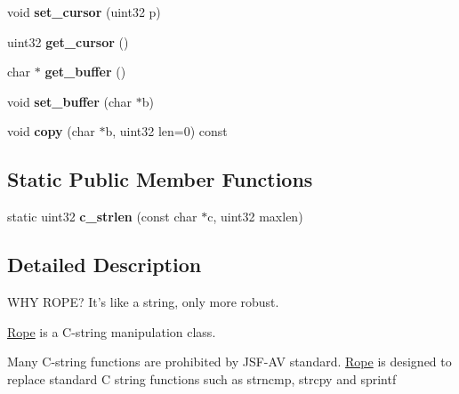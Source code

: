 \begin{DoxyCompactItemize}
\item 
\hypertarget{classetk_1_1_rope_a882650da4df7e20bd95f01c9e08ae0a5}{void {\bfseries set\-\_\-cursor} (uint32 p)}\label{classetk_1_1_rope_a882650da4df7e20bd95f01c9e08ae0a5}

\item 
\hypertarget{classetk_1_1_rope_a4683a4ade92618f04252ee503b58ca00}{uint32 {\bfseries get\-\_\-cursor} ()}\label{classetk_1_1_rope_a4683a4ade92618f04252ee503b58ca00}

\item 
\hypertarget{classetk_1_1_rope_a4a371e818da7d9b97bd5359fbbe5f6da}{char $\ast$ {\bfseries get\-\_\-buffer} ()}\label{classetk_1_1_rope_a4a371e818da7d9b97bd5359fbbe5f6da}

\item 
\hypertarget{classetk_1_1_rope_ad38997d446f67b330af0a84f158bcbcf}{void {\bfseries set\-\_\-buffer} (char $\ast$b)}\label{classetk_1_1_rope_ad38997d446f67b330af0a84f158bcbcf}

\item 
\hypertarget{classetk_1_1_rope_a598437e9f9ad5424a05d111f9219aa22}{void {\bfseries copy} (char $\ast$b, uint32 len=0) const }\label{classetk_1_1_rope_a598437e9f9ad5424a05d111f9219aa22}

\end{DoxyCompactItemize}
\subsection*{Static Public Member Functions}
\begin{DoxyCompactItemize}
\item 
\hypertarget{classetk_1_1_rope_a272f2b61cbe4e2d40c837702ecacedd1}{static uint32 {\bfseries c\-\_\-strlen} (const char $\ast$c, uint32 maxlen)}\label{classetk_1_1_rope_a272f2b61cbe4e2d40c837702ecacedd1}

\end{DoxyCompactItemize}


\subsection{Detailed Description}
W\-H\-Y R\-O\-P\-E? It's like a string, only more robust. 

\hyperlink{classetk_1_1_rope}{Rope} is a C-\/string manipulation class.

Many C-\/string functions are prohibited by J\-S\-F-\/\-A\-V standard. \hyperlink{classetk_1_1_rope}{Rope} is designed to replace standard C string functions such as strncmp, strcpy and sprintf

